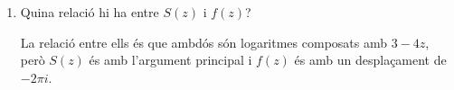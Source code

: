 \documentclass[10pt,a4paper]{article}
\begin{document}
\begin{enumerate}
\begin{enumerate}
\begin{framed}
	\end{framed}	
	\item Quina relació hi ha entre $S(z)$ i $f(z)$?
	
	\begin{framed}
	
	La relació entre ells és que ambdós són logaritmes composats amb $3-4z$, però $S(z)$ és amb l'argument principal i $f(z)$ és amb un desplaçament de $-2\pi i$.
	
	\end{framed}
	\end{enumerate}
	
\end{enumerate}
\end{document}
